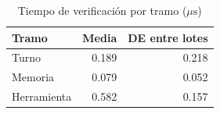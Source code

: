 \begin{table}[!t]
\caption{Tiempo de verificación por tramo ($\mu\mathrm{s}$)}
\label{tab:latency_bench}
\centering\footnotesize
\begin{tabular}{lrr}
\hline
Tramo & Media & DE entre lotes\\\hline
Turno & 0.189 & 0.218\\
Memoria & 0.079 & 0.052\\
Herramienta & 0.582 & 0.157\\
\hline
\end{tabular}
\end{table}
